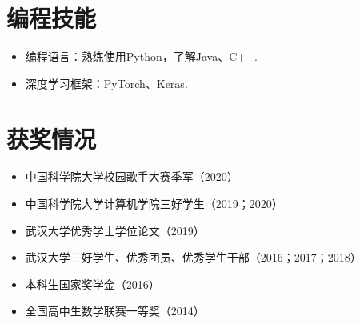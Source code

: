 \documentclass{resume}
\begin{document}
\section{编程技能}
\small
\begin{itemize}
  \item 编程语言：熟练使用Python，了解Java、C++.
  \item 深度学习框架：PyTorch、Keras.
\end{itemize}

\section{获奖情况}
\begin{itemize}
  \item 中国科学院大学校园歌手大赛季军（2020）
  \item 中国科学院大学计算机学院三好学生（2019；2020）
  \item 武汉大学优秀学士学位论文（2019）
  \item 武汉大学三好学生、优秀团员、优秀学生干部（2016；2017；2018）
  \item 本科生国家奖学金（2016）
  \item 全国高中生数学联赛一等奖（2014）
\end{itemize}
\end{document}
